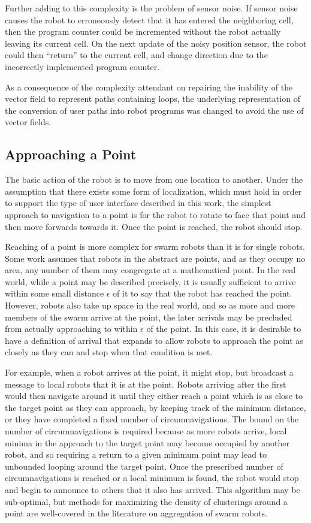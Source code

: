 Further adding to this complexity is the problem of sensor noise. 
If sensor noise causes the robot to erroneously detect that it has entered the neighboring cell, then the program counter could be incremented without the robot actually leaving its current cell. 
On the next update of the noisy position sensor, the robot could then ``return'' to the current cell, and change direction due to the incorrectly implemented program counter. 

As a consequence of the complexity attendant on repairing the inability of the vector field to represent paths containing loops, the underlying representation of the conversion of user paths into robot programs was changed to avoid the use of vector fields. 

\subsection{Approaching a Point}

The basic action of the robot is to move from one location to another. 
Under the assumption that there exists some form of localization, which must hold in order to support the type of user interface described in this work, the simplest approach to navigation to a point is for the robot to rotate to face that point and then move forwards towards it. Once the point is reached, the robot should stop. 

Reaching of a point is more complex for swarm robots than it is for single robots. 
Some work assumes that robots in the abstract are points, and as they occupy no area, any number of them may congregate at a mathematical point. 
In the real world, while a point may be described precisely, it is usually sufficient to arrive within some small distance $\epsilon$ of it to say that the robot has reached the point. 
However, robots also take up space in the real world, and so as more and more members of the swarm arrive at the point, the later arrivals may be precluded from actually approaching to within $\epsilon$ of the point.
In this case, it is desirable to have a definition of arrival that expands to allow robots to approach the point as closely as they can and stop when that condition is met. 

For example, when a robot arrives at the point, it might stop, but broadcast a message to local robots that it is at the point. 
Robots arriving after the first would then navigate around it until they either reach a point which is as close to the target point as they can approach, by keeping track of the minimum distance, or they have completed a fixed number of circumnavigations. 
The bound on the number of circumnavigations is required because as more robots arrive, local minima in the approach to the target point may become occupied by another robot, and so requiring a return to a given minimum point may lead to unbounded looping around the target point. 
Once the prescribed number of circumnavigations is reached or a local minimum is found, the robot would stop and begin to announce to others that it also has arrived. 
This algorithm may be sub-optimal, but methods for maximizing the density of clusterings around a point are well-covered in the literature on aggregation of swarm robots. 

